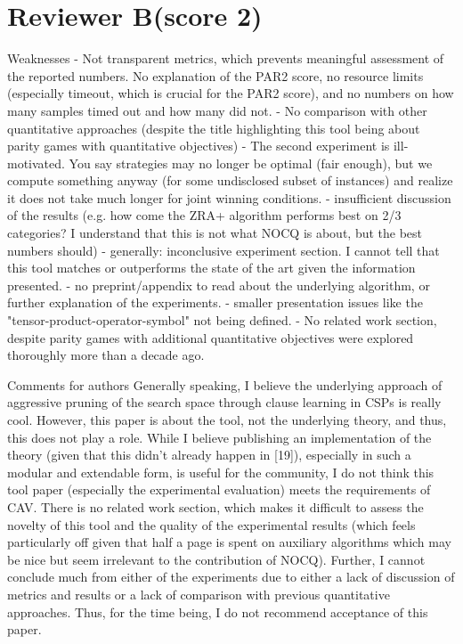 \documentclass{article}
\begin{document}
\section{Reviewer B(score 2)}\label{rev:B}
\begin{reviewer}
Weaknesses
- Not transparent metrics, which prevents meaningful assessment of the reported numbers. No explanation of the PAR2 score, no resource limits (especially timeout, which is crucial for the PAR2 score), and no numbers on how many samples timed out and how many did not.
- No comparison with other quantitative approaches (despite the title highlighting this tool being about parity games with quantitative objectives)
- The second experiment is ill-motivated. You say strategies may no longer be optimal (fair enough), but we compute something anyway (for some undisclosed subset of instances) and realize it does not take much longer for joint winning conditions.
- insufficient discussion of the results (e.g. how come the ZRA+ algorithm performs best on 2/3 categories? I understand that this is not what NOCQ is about, but the best numbers should)
- generally: inconclusive experiment section. I cannot tell that this tool matches or outperforms the state of the art given the information presented.
- no preprint/appendix to read about the underlying algorithm, or further explanation of the experiments.
- smaller presentation issues like the "tensor-product-operator-symbol" not being defined. 
- No related work section, despite parity games with additional quantitative objectives were explored thoroughly more than a decade ago.

Comments for authors
Generally speaking, I believe the underlying approach of aggressive pruning of the search space through clause learning in CSPs is really cool. However, this paper is about the tool, not the underlying theory, and thus, this does not play a role. While I believe publishing an implementation of the theory (given that this didn't already happen in [19]), especially in such a modular and extendable form, is useful for the community, I do not think this tool paper (especially the experimental evaluation) meets the requirements of CAV. There is no related work section, which makes it difficult to assess the novelty of this tool and the quality of the experimental results (which feels particularly off given that half a page is spent on auxiliary algorithms which may be nice but seem irrelevant to the contribution of NOCQ). Further, I cannot conclude much from either of the experiments due to either a lack of discussion of metrics and results or a lack of comparison with previous quantitative approaches. Thus, for the time being, I do not recommend acceptance of this paper.


\end{reviewer}
\end{document}
